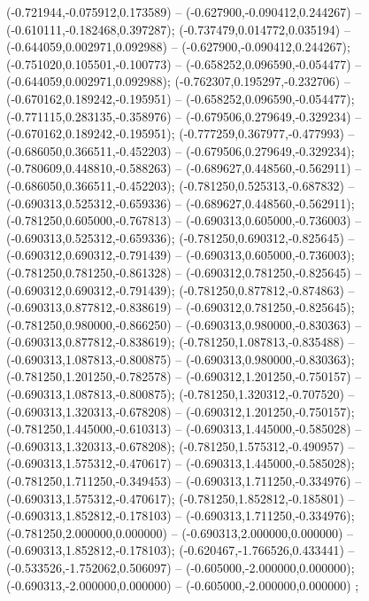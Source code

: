  (-0.721944,-0.075912,0.173589) -- (-0.627900,-0.090412,0.244267) -- (-0.610111,-0.182468,0.397287);
 (-0.737479,0.014772,0.035194) -- (-0.644059,0.002971,0.092988) -- (-0.627900,-0.090412,0.244267);
 (-0.751020,0.105501,-0.100773) -- (-0.658252,0.096590,-0.054477) -- (-0.644059,0.002971,0.092988);
 (-0.762307,0.195297,-0.232706) -- (-0.670162,0.189242,-0.195951) -- (-0.658252,0.096590,-0.054477);
 (-0.771115,0.283135,-0.358976) -- (-0.679506,0.279649,-0.329234) -- (-0.670162,0.189242,-0.195951);
 (-0.777259,0.367977,-0.477993) -- (-0.686050,0.366511,-0.452203) -- (-0.679506,0.279649,-0.329234);
 (-0.780609,0.448810,-0.588263) -- (-0.689627,0.448560,-0.562911) -- (-0.686050,0.366511,-0.452203);
 (-0.781250,0.525313,-0.687832) -- (-0.690313,0.525312,-0.659336) -- (-0.689627,0.448560,-0.562911);
 (-0.781250,0.605000,-0.767813) -- (-0.690313,0.605000,-0.736003) -- (-0.690313,0.525312,-0.659336);
 (-0.781250,0.690312,-0.825645) -- (-0.690312,0.690312,-0.791439) -- (-0.690313,0.605000,-0.736003);
 (-0.781250,0.781250,-0.861328) -- (-0.690312,0.781250,-0.825645) -- (-0.690312,0.690312,-0.791439);
 (-0.781250,0.877812,-0.874863) -- (-0.690313,0.877812,-0.838619) -- (-0.690312,0.781250,-0.825645);
 (-0.781250,0.980000,-0.866250) -- (-0.690313,0.980000,-0.830363) -- (-0.690313,0.877812,-0.838619);
 (-0.781250,1.087813,-0.835488) -- (-0.690313,1.087813,-0.800875) -- (-0.690313,0.980000,-0.830363);
 (-0.781250,1.201250,-0.782578) -- (-0.690312,1.201250,-0.750157) -- (-0.690313,1.087813,-0.800875);
 (-0.781250,1.320312,-0.707520) -- (-0.690313,1.320313,-0.678208) -- (-0.690312,1.201250,-0.750157);
 (-0.781250,1.445000,-0.610313) -- (-0.690313,1.445000,-0.585028) -- (-0.690313,1.320313,-0.678208);
 (-0.781250,1.575312,-0.490957) -- (-0.690313,1.575312,-0.470617) -- (-0.690313,1.445000,-0.585028);
 (-0.781250,1.711250,-0.349453) -- (-0.690313,1.711250,-0.334976) -- (-0.690313,1.575312,-0.470617);
 (-0.781250,1.852812,-0.185801) -- (-0.690313,1.852812,-0.178103) -- (-0.690313,1.711250,-0.334976);
 (-0.781250,2.000000,0.000000) -- (-0.690313,2.000000,0.000000) -- (-0.690313,1.852812,-0.178103);
 (-0.620467,-1.766526,0.433441) -- (-0.533526,-1.752062,0.506097) -- (-0.605000,-2.000000,0.000000);
 (-0.690313,-2.000000,0.000000) -- (-0.605000,-2.000000,0.000000) ;
